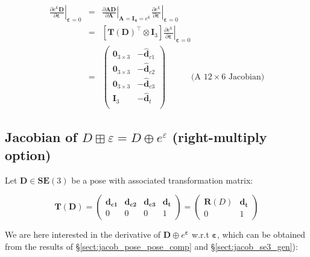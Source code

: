 \documentclass[a4paper,11pt]{report}
\newcommand{\E}{{\bm{\varepsilon}}}
\begin{document}
\begin{eqnarray}
\left. \frac{\partial e^\E \mathbf{D}}{\partial \E} \right|_{\E = 0}
&=&
\left. \frac{\partial \mathbf{A} \mathbf{D}}{\partial \mathbf{A} } \right|_{\mathbf{A}=\mathbf{I_4} = e^\E}
\left. \frac{\partial e^\E}{\partial \E} \right|_{\E=0}
\\
&=&
\left[ \mathbf{T}(\mathbf{D})^\top \otimes  \mathbf{I}_3 \right]
\left. \frac{\partial e^\E}{\partial \E} \right|_{\E=0}
\\
&=&
\left(
\begin{array}{cc}
 \mathbf{0}_{3\times 3}  & -\hat{\mathbf{d}}_{c1} \\
 \mathbf{0}_{3\times 3}  & -\hat{\mathbf{d}}_{c2} \\
 \mathbf{0}_{3\times 3}  & -\hat{\mathbf{d}}_{c3} \\
 \mathbf{I}_{3}  & -\hat{\mathbf{d}}_{t} \\
\end{array}
\right)
\quad\quad\quad \text{(A $12 \times 6$ Jacobian)}
\end{eqnarray}

\newpage

\subsection{Jacobian of $D\boxplus \varepsilon = D \oplus e^\varepsilon$  (right-multiply option)}
\label{sect:jacob_De}

Let $\mathbf{D} \in \mathbf{SE}(3)$ be a pose with associated transformation matrix:

\begin{equation}
\mathbf{T}(\mathbf{D}) =
\left(
\begin{array}{ccc|c}
 \mathbf{d_{c1}}  & \mathbf{d_{c2}}  & \mathbf{d_{c3}}  & \mathbf{d_{t}}  \\
\hline
  0 & 0 & 0 & 1
\end{array}
\right)
=
\left(
\begin{array}{c|c}
 \mathbf{R}(D) & \mathbf{d_{t}} \\
\hline
     0 & 1
\end{array}
\right)
\end{equation}


We are here interested in the derivative of $\mathbf{D} \oplus e^\E$ w.r.t $\E$,
which can be obtained from the results of \S\ref{sect:jacob_pose_pose_comp} and \S\ref{sect:jacob_se3_gen}):
\end{document}
